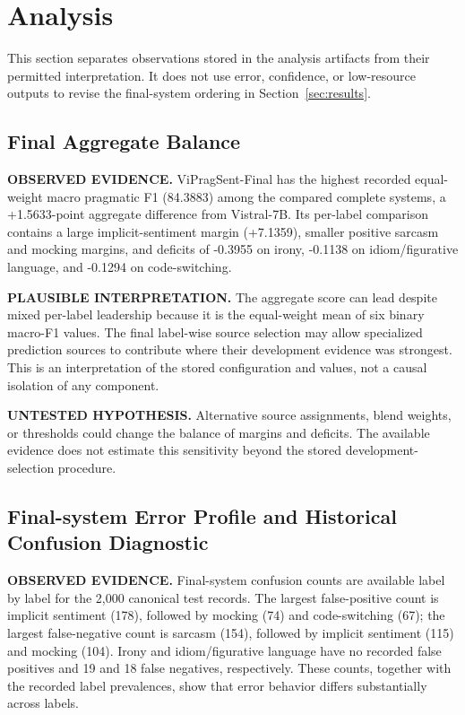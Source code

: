 \section{Analysis}
\label{sec:analysis}

This section separates observations stored in the analysis artifacts from their permitted interpretation.  It does not use error, confidence, or low-resource outputs to revise the final-system ordering in Section~\ref{sec:results}.

\subsection{Final Aggregate Balance}

\textbf{OBSERVED EVIDENCE.} ViPragSent-Final has the highest recorded equal-weight macro pragmatic F1 (84.3883) among the compared complete systems, a +1.5633-point aggregate difference from Vistral-7B.  Its per-label comparison contains a large implicit-sentiment margin (+7.1359), smaller positive sarcasm and mocking margins, and deficits of -0.3955 on irony, -0.1138 on idiom/figurative language, and -0.1294 on code-switching.

\textbf{PLAUSIBLE INTERPRETATION.} The aggregate score can lead despite mixed per-label leadership because it is the equal-weight mean of six binary macro-F1 values.  The final label-wise source selection may allow specialized prediction sources to contribute where their development evidence was strongest.  This is an interpretation of the stored configuration and values, not a causal isolation of any component.

\textbf{UNTESTED HYPOTHESIS.} Alternative source assignments, blend weights, or thresholds could change the balance of margins and deficits.  The available evidence does not estimate this sensitivity beyond the stored development-selection procedure.

\subsection{Final-system Error Profile and Historical Confusion Diagnostic}

\textbf{OBSERVED EVIDENCE.} Final-system confusion counts are available label by label for the 2,000 canonical test records. The largest false-positive count is implicit sentiment (178), followed by mocking (74) and code-switching (67); the largest false-negative count is sarcasm (154), followed by implicit sentiment (115) and mocking (104). Irony and idiom/figurative language have no recorded false positives and 19 and 18 false negatives, respectively. These counts, together with the recorded label prevalences, show that error behavior differs substantially across labels.

